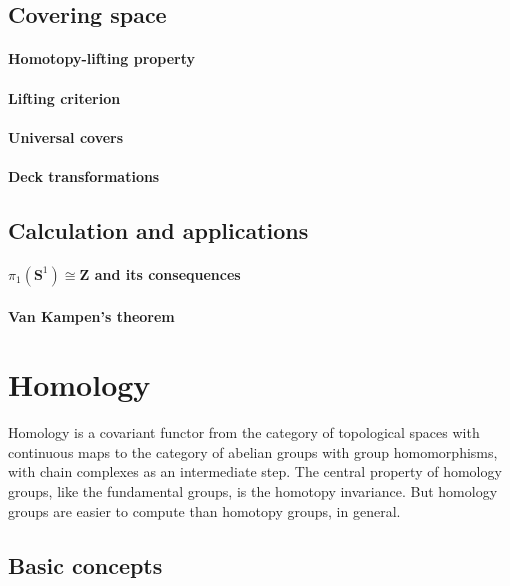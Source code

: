 \documentclass[11pt]{article}
\theoremstyle{definition}
\theoremstyle{plain}
\newcommand{\Z}{\mathbf{Z}}
\newcommand{\s}{\mathbf{S}}
\begin{document}
\subsection{Covering space}

\paragraph{Homotopy-lifting property}

\paragraph{Lifting criterion}

\paragraph{Universal covers}

\paragraph{Deck transformations}

\subsection{Calculation and applications}

\paragraph{$\pi_1(\s^1)\cong\Z$ and its consequences}

\paragraph{Van Kampen's theorem}

\newpage
\section{Homology}

Homology is a covariant functor from the category of topological spaces with continuous maps to the category of abelian groups with group homomorphisms, with chain complexes as an intermediate step. The central property of homology groups, like the fundamental groups, is the homotopy invariance. But homology groups are easier to compute than homotopy groups, in general.

\subsection{Basic concepts}
\end{document}
